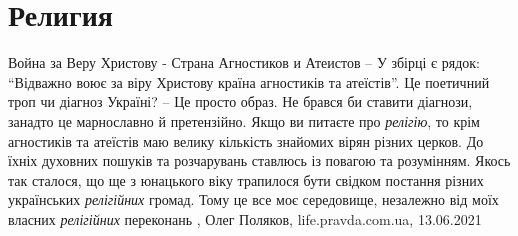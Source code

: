  
 
 
 
 
\chapter{Религия}

Война за Веру Христову - Страна Агностиков и Атеистов
– У збірці є рядок: \enquote{Відважно воює за віру Христову країна агностиків та
атеїстів}. Це поетичний троп чи діагноз Україні?  – Це просто образ. Не брався
би ставити діагнози, занадто це марнославно й претензійно. Якщо ви питаєте про
\emph{релігію}, то крім агностиків та атеїстів маю велику кількість знайомих
вірян різних церков. До їхніх духовних пошуків та розчарувань ставлюсь із
повагою та розумінням. Якось так сталося, що ще з юнацького віку трапилося
бути свідком постання різних українських \emph{релігійних} громад. Тому це все
моє середовище, незалежно від моїх власних \emph{релігійних} переконань
, Олег Поляков, life.pravda.com.ua, 13.06.2021

